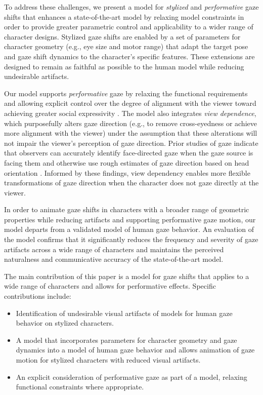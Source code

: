 To address these challenges, we present a model for \textit{stylized} and \textit{performative} gaze shifts that enhances a state-of-the-art model by relaxing model constraints in order to provide greater parametric control and applicability to a wider range of character designs. Stylized gaze shifts are enabled by a set of parameters for  character geometry (e.g., eye size and motor range) that adapt the target pose and gaze shift dynamics to the character's specific features. These extensions are designed to remain as faithful as possible to the human model while reducing undesirable artifacts.

Our model supports \textit{performative} gaze by relaxing the functional requirements and allowing explicit control over the degree of alignment with the viewer toward achieving greater social expressivity \cite{argyle1976gaze,goldberg1969distance,andrist2012designing}. The model also integrates \textit{view dependence}, which purposefully alters gaze direction (e.g., to remove cross-eyedness or achieve more alignment with the viewer) under the assumption that these alterations will not impair the viewer's perception of gaze direction. Prior studies of gaze indicate that observers can accurately identify face-directed gaze when the gaze source is facing them and otherwise use rough estimates of gaze direction based on head orientation \cite{cranach1973looking}. Informed by these findings, view dependency enables more flexible transformations of gaze direction when the character does not gaze directly at the viewer.

In order to animate gaze shifts in characters with a broader range of geometric properties while reducing artifacts and supporting performative gaze motion, our model departs from a validated model of human gaze behavior. An evaluation of the model confirms that it significantly reduces the frequency and severity of gaze artifacts across a wide range of characters and maintains the perceived naturalness and communicative accuracy of the state-of-the-art model.

The main contribution of this paper is a model for gaze shifts that applies to a wide range of characters and allows for performative effects. Specific contributions include:

\begin{itemize}
\item Identification of undesirable visual artifacts of models for human gaze behavior on stylized characters.
\item A model that incorporates parameters for character geometry and gaze dynamics into a model of human gaze behavior and allows animation of gaze motion for stylized characters with reduced visual artifacts.
\item An explicit consideration of performative gaze as part of a model, relaxing functional constraints where appropriate.
\end{itemize}
